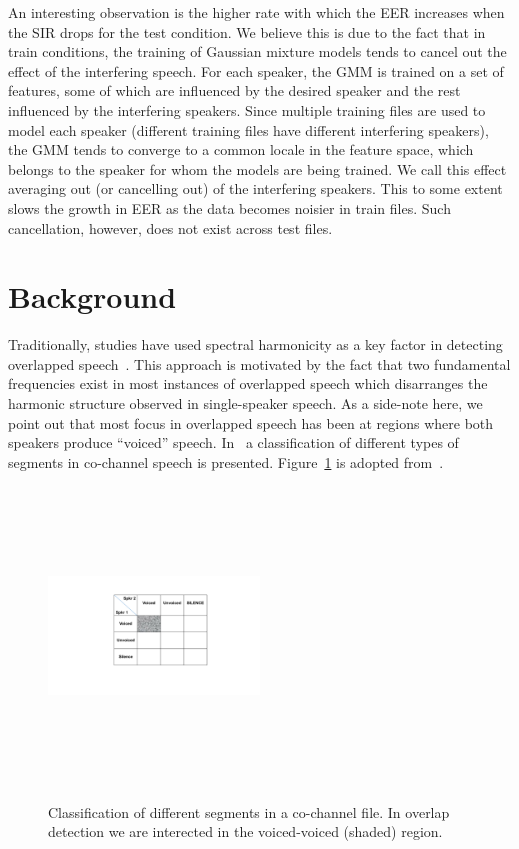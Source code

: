 An interesting observation is the higher rate with which the EER increases when the SIR drops for the test condition.
We believe this is due to the fact that in train conditions, the training of Gaussian mixture models tends to cancel out the effect of the interfering speech.
For each speaker, the GMM is trained on a set of features, some of which are influenced by the desired speaker and the rest influenced by the interfering speakers.
Since multiple training files are used to model each speaker (different training files have different interfering speakers), the GMM tends to converge to a common locale in the feature space, which belongs to the speaker for whom the models are being trained.
We call this effect averaging out (or cancelling out) of the interfering speakers.
This to some extent slows the growth in EER as the data becomes noisier in train files.
Such cancellation, however, does not exist across test files.

\section{Background}

Traditionally, studies have used spectral harmonicity as a key factor in detecting overlapped speech~\cite{nav_icassp13,smolenski_tut}. 
This approach is motivated by the fact that two fundamental frequencies exist in most instances of overlapped speech which disarranges the harmonic structure observed in single-speaker speech. 
As a side-note here, we point out that most focus in overlapped speech has been at regions where both speakers produce ``voiced'' speech. In~\cite{morgan_cochannel} a classification of different types of segments in co-channel speech is presented. Figure~\ref{fig:morgan_v_uv_table} is adopted from~\cite{morgan_cochannel}. 

\begin{figure}[h!]
	\centering
	\includegraphics[height = 3.1in, width=0.5\textwidth]{figures/morgan_v_uv_table}
	\label{fig:morgan_v_uv_table}
	\caption{Classification of different segments in a co-channel file. In overlap detection we are interected in 
		the voiced-voiced (shaded) region.}
\end{figure}


